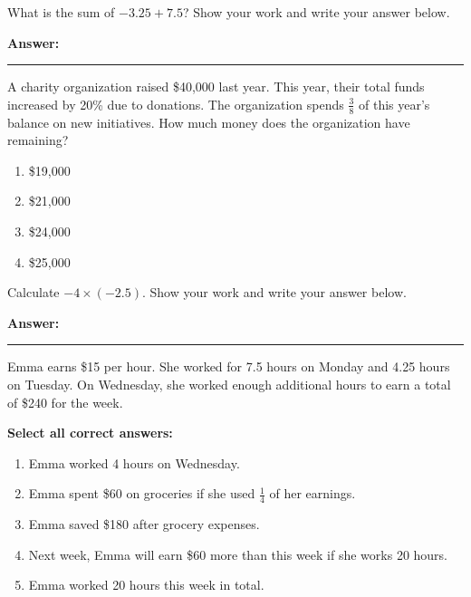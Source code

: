 \documentclass[12pt]{article}
\begin{document}
\begin{tcolorbox}[colframe=black!50, colback=white, title=\textbf{Problem 3 (7.NS.A.1)}]
What is the sum of \( -3.25 + 7.5 \)? Show your work and write your answer below.

\vspace{1.75cm}

\textbf{Answer:} \rule{0.5\textwidth}{0.4mm}
\end{tcolorbox}

\begin{tcolorbox}[colframe=black!50, colback=white, title=\textbf{Problem 4 (7.RP.A.3)}]
A charity organization raised \$40,000 last year. This year, their total funds increased by 20\% due to donations. The organization spends \(\frac{3}{8}\) of this year's balance on new initiatives. How much money does the organization have remaining?

\begin{enumerate}[label=(\Alph*)]
    \item \$19,000
    \item \$21,000
    \item \$24,000
    \item \$25,000
\end{enumerate}
\end{tcolorbox}

\begin{tcolorbox}[colframe=black!50, colback=white, title=\textbf{Problem 5 (7.NS.A.2)}]
Calculate \( -4 \times (-2.5) \). Show your work and write your answer below.

\vspace{2cm}

\textbf{Answer:} \rule{0.5\textwidth}{0.4mm}
\end{tcolorbox}

\begin{tcolorbox}[colframe=black!50, colback=white, title=\textbf{Problem 6 (7.EE.B.3)}]
Emma earns \$15 per hour. She worked for 7.5 hours on Monday and 4.25 hours on Tuesday. On Wednesday, she worked enough additional hours to earn a total of \$240 for the week.

\textbf{Select all correct answers:}
\begin{enumerate}[label=(\(\Box\))]
    \item Emma worked 4 hours on Wednesday.
    \item Emma spent \$60 on groceries if she used \(\frac{1}{4}\) of her earnings.
    \item Emma saved \$180 after grocery expenses.
    \item Next week, Emma will earn \$60 more than this week if she works 20 hours.
    \item Emma worked 20 hours this week in total.
\end{enumerate}
\vspace{2cm}
\end{tcolorbox}
\end{document}

